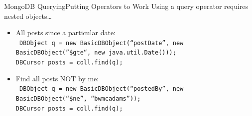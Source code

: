 \documentclass{beamer}
\begin{document}
\begin{frame}{MongoDB Querying}{Putting Operators to Work}
    Using a query operator requires nested objects\ldots
    \begin{itemize}
        \item<2-> All posts since a particular date:\\ \texttt{\small
            DBObject q = new BasicDBObject(``postDate'', new BasicDBObject(''\$gte``, new java.util.Date()));\\ 
            DBCursor posts = coll.find(q);\\
            }
        \item<3-> Find all posts NOT by me:\\ \texttt{\small
            DBObject q = new BasicDBObject(``postedBy'', new BasicDBObject(``\$ne'', ``bwmcadams''));\\
            DBCursor posts = coll.find(q);\\
        }
    \end{itemize}
\end{frame}
\end{document}
